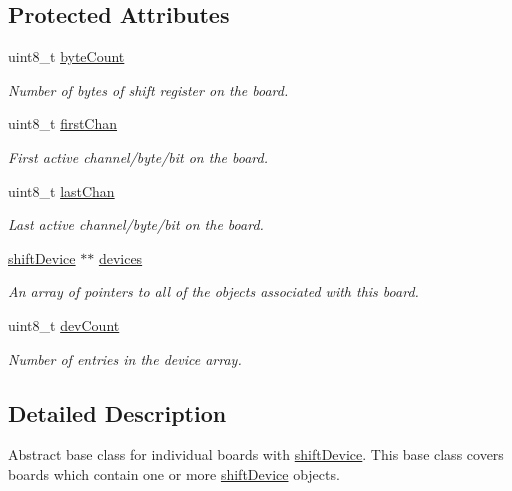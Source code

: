 \subsection*{Protected Attributes}
\begin{DoxyCompactItemize}
\item 
uint8\_\-t \hyperlink{classshift_board_a814955fb002a8aa0218052c7adc130ea}{byteCount}
\begin{DoxyCompactList}\small\item\em Number of bytes of shift register on the board. \item\end{DoxyCompactList}\item 
uint8\_\-t \hyperlink{classshift_board_abdbf7eaef6353a2ffddbf69753a82ef2}{firstChan}
\begin{DoxyCompactList}\small\item\em First active channel/byte/bit on the board. \item\end{DoxyCompactList}\item 
uint8\_\-t \hyperlink{classshift_board_a61a3f53b408a4165d38b613efd2b4d5e}{lastChan}
\begin{DoxyCompactList}\small\item\em Last active channel/byte/bit on the board. \item\end{DoxyCompactList}\item 
\hyperlink{classshift_device}{shiftDevice} $\ast$$\ast$ \hyperlink{classshift_board_a07a2549714f7064fa5e48ec63fdb5efb}{devices}
\begin{DoxyCompactList}\small\item\em An array of pointers to all of the objects associated with this board. \item\end{DoxyCompactList}\item 
uint8\_\-t \hyperlink{classshift_board_ae7bba07850ced1219dcf67cab33de929}{devCount}
\begin{DoxyCompactList}\small\item\em Number of entries in the device array. \item\end{DoxyCompactList}\end{DoxyCompactItemize}


\subsection{Detailed Description}
Abstract base class for individual boards with \hyperlink{classshift_device}{shiftDevice}. This base class covers boards which contain one or more \hyperlink{classshift_device}{shiftDevice} objects. 

